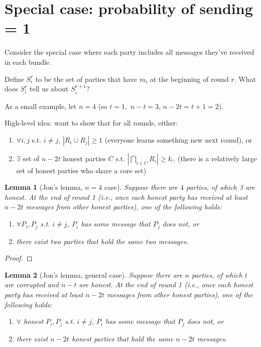 \documentclass{article}
\newtheorem{lemma}{Lemma}
\begin{document}
\section{Special case: probability of sending = 1}

Consider the special case where each party includes all messages they've received in each bundle.

Define $S_i^r$ to be the set of parties that have $m_i$ at the beginning of round $r$. What does $S^r_i$ tell us about $S^{r+1}_i$?

As a small example, let $n=4$ (so $t=1,$ $n-t=3$, $n-2t=t+1=2$).

High-level idea: want to show that for all rounds, either:
\begin{enumerate}
    \item $\forall i,j$ s.t. $i\neq j$, $|\overline{R_i}\cup R_j|\geq 1$ (everyone learns something new next round), or
    \item $\exists$ set of $n-2t$ honest parties $C$ s.t. $|\bigcap_{i\in C} R_i|\geq k_{\cap}$ (there is a relatively large set of honest parties who share a core set)
\end{enumerate}

\begin{lemma}[Jon's lemma, $n=4$ case]
Suppose there are $4$ parties, of which 3 are honest. 
At the end of round 1 (i.e., once
each honest party has received at least $n-2t$ messages from other
honest parties), one of the following holds:
\begin{enumerate}
    \item $\forall P_i,P_j$ s.t. $i\neq j$, $P_i$ has some message that $P_j$ does not, or
    \item there exist two parties that hold the same two messages.
\end{enumerate}
\end{lemma}
\begin{proof}

\end{proof}

\begin{lemma}[Jon's lemma, general case]
Suppose there are $n$ parties, of which $t$ are corrupted and $n-t$ are honest. 
At the end of round 1 (i.e., once
each honest party has received at least $n-2t$ messages from other
honest parties), one of the following holds:
\begin{enumerate}
    \item $\forall$ honest $P_i,P_j$ s.t. $i\neq j$, $P_i$ has some message that $P_j$ does not, or
    \item there exist $n-2t$ honest parties that hold the same $n-2t$ messages.
\end{enumerate}
\end{lemma}
\end{document}
